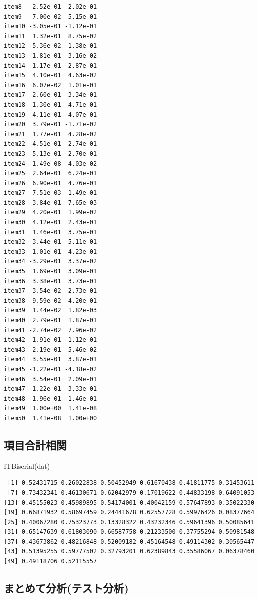 \documentclass[
  a4paper,
]{ltjsbook}
\newenvironment{Shaded}{\begin{snugshade}}{\end{snugshade}}
\newcommand{\FunctionTok}[1]{\textcolor[rgb]{0.28,0.35,0.67}{#1}}
\newcommand{\NormalTok}[1]{\textcolor[rgb]{0.00,0.23,0.31}{#1}}
\begin{document}
\begin{verbatim}
item8   2.52e-01  2.02e-01
item9   7.00e-02  5.15e-01
item10 -3.05e-01 -1.12e-01
item11  1.32e-01  8.75e-02
item12  5.36e-02  1.38e-01
item13  1.81e-01 -3.16e-02
item14  1.17e-01  2.87e-01
item15  4.10e-01  4.63e-02
item16  6.07e-02  1.01e-01
item17  2.60e-01  3.34e-01
item18 -1.30e-01  4.71e-01
item19  4.11e-01  4.07e-01
item20  3.79e-01 -1.71e-02
item21  1.77e-01  4.28e-02
item22  4.51e-01  2.74e-01
item23  5.13e-01  2.70e-01
item24  1.49e-08  4.03e-02
item25  2.64e-01  6.24e-01
item26  6.90e-01  4.76e-01
item27 -7.51e-03  1.49e-01
item28  3.84e-01 -7.65e-03
item29  4.20e-01  1.99e-02
item30  4.12e-01  2.43e-01
item31  1.46e-01  3.75e-01
item32  3.44e-01  5.11e-01
item33  1.01e-01  4.23e-01
item34 -3.29e-01  3.37e-02
item35  1.69e-01  3.09e-01
item36  3.38e-01  3.73e-01
item37  3.54e-02  2.73e-01
item38 -9.59e-02  4.20e-01
item39  1.44e-02  1.82e-03
item40  2.79e-01  1.87e-01
item41 -2.74e-02  7.96e-02
item42  1.91e-01  1.12e-01
item43  2.19e-01 -5.46e-02
item44  3.55e-01  3.87e-01
item45 -1.22e-01 -4.18e-02
item46  3.54e-01  2.09e-01
item47 -1.22e-01  3.33e-01
item48 -1.96e-01  1.46e-01
item49  1.00e+00  1.41e-08
item50  1.41e-08  1.00e+00
\end{verbatim}

\subsection{項目合計相関}\label{ux9805ux76eeux5408ux8a08ux76f8ux95a2}

\begin{Shaded}
\begin{Highlighting}[]
\FunctionTok{ITBiserial}\NormalTok{(dat)}
\end{Highlighting}
\end{Shaded}

\begin{verbatim}
 [1] 0.52431715 0.26022838 0.50452949 0.61670438 0.41811775 0.31453611
 [7] 0.73432341 0.46130671 0.62042979 0.17019622 0.44833198 0.64091053
[13] 0.45155023 0.45989895 0.54174001 0.40042159 0.57647893 0.35022330
[19] 0.66871932 0.58697459 0.24441678 0.62557728 0.59976426 0.08377664
[25] 0.40067280 0.75323773 0.13328322 0.43232346 0.59641396 0.50085641
[31] 0.65147639 0.61803090 0.66587758 0.21233500 0.37755294 0.50981548
[37] 0.43673862 0.48216848 0.52009182 0.45164548 0.49114302 0.30565447
[43] 0.51395255 0.59777502 0.32793201 0.62389843 0.35586067 0.06378460
[49] 0.49118706 0.52115557
\end{verbatim}

\subsection{まとめて分析(テスト分析)}\label{ux307eux3068ux3081ux3066ux5206ux6790ux30c6ux30b9ux30c8ux5206ux6790}
\end{document}
